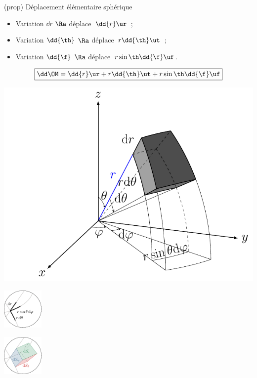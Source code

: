 \documentclass[../../main/main.tex]{subfiles}
\begin{document}
\begin{tcb*}[sidebyside, righthand ratio=.5](prop)
	{Déplacement élémentaire sphérique}
	\begin{itemize}
		\item Variation $\dd{r}$ $\Ra$ déplace\mnt\ $\dd{r}\ur$~;
		\item Variation $\dd{\th}$ $\Ra$ déplace\mnt\ $r\dd{\th}\ut$~;
		\item Variation $\dd{\f}$ $\Ra$ déplace\mnt\ $r\sin\th\dd{\f}\uf$.
	\end{itemize}
	\[\boxed{\dd\OM = \dd{r}\ur + r\dd{\th}\ut + r\sin\th\dd{\f}\uf}\]
	\tcblower
	\noindent
	\begin{minipage}{.59\linewidth}
		\begin{center}
			\includegraphics[width=\linewidth]{sph_vol}
			\captionsetup{justification=centering}
		\end{center}
	\end{minipage}
	\begin{minipage}{.39\linewidth}
		\begin{center}
			\includegraphics[height=2cm]{zoom_sph_lgn}
		\end{center}
		\begin{center}
			\includegraphics[height=2cm]{zoom_sph_sfc}
			\captionsetup{justification=centering}
		\end{center}
	\end{minipage}
\end{tcb*}
\end{document}
